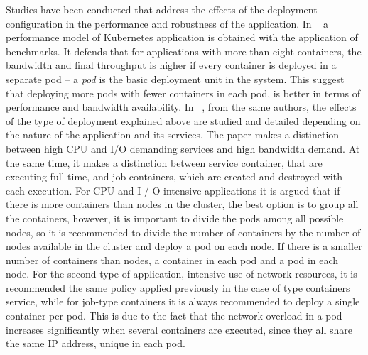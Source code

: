 \documentclass[conference]{IEEEtran}
\begin{document}

Studies have been conducted that address the effects of the deployment  configuration in the performance and robustness of the application. In ~\cite{Rana16} a performance model of Kubernetes application is obtained with the application of benchmarks. It defends that for applications with more than eight containers, the bandwidth and final throughput is higher if every container is deployed in a separate pod -- a \emph{pod} is the basic deployment unit in the system. This suggest that deploying more pods with fewer containers in each pod, is better in terms of performance and bandwidth availability. In ~\cite{Orana18}, from the same authors, the  effects of the type of deployment explained above are studied and detailed depending on the nature of the application and its services. The paper makes a distinction between high CPU and I/O demanding services and high bandwidth demand. At the same time, it makes a distinction between service container, that are executing full time, and job containers, which are created and destroyed with each execution.  For CPU and I / O intensive applications it is argued that if there is more containers than nodes in the cluster, the best option is to group all the  containers, however, it is important to divide the pods among all possible nodes, so it is recommended to divide the number of containers by the number of nodes  available in the cluster and deploy a pod on each node. If there is a smaller number of containers than nodes, a container in each pod and a pod in each node.  For the second type of application, intensive use of network resources, it is recommended the same policy applied previously in the case of type containers service, while for job-type containers it is always recommended to deploy a single container per pod. This is due to the fact that the network overload in a pod increases significantly when several containers are executed, since they all share the same IP address, unique in each pod.
\end{document}

